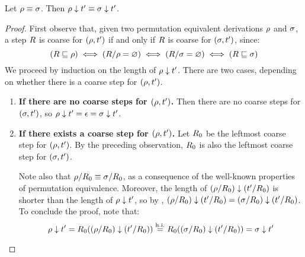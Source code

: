 \begin{lemma}
Let $\rho \equiv \sigma$. Then $\rho \downarrow t' \equiv \sigma \downarrow t'$.
\end{lemma}
\begin{proof}
First observe that, given two permutation equivalent derivations $\rho$ and $\sigma$,
a step $R$ is coarse for $(\rho,t')$ if and only if $R$ is coarse for $(\sigma,t')$,
since:
\[
  (R \sqsubseteq \rho) \iff (R/\rho = \varnothing) \iff (R/\sigma = \varnothing) \iff (R \sqsubseteq \sigma)
\]
We proceed by induction on the length of $\rho \downarrow t'$.
There are two cases, depending on whether there is a coarse step for $(\rho,t')$.
\begin{enumerate}
\item {\bf If there are no coarse steps for $(\rho,t')$.}
  Then there are no coarse steps for $(\sigma,t')$,
  so $\rho \downarrow t' = \epsilon = \sigma \downarrow t'$.
\item {\bf If there exists a coarse step for $(\rho,t')$.}
  Let $R_0$ be the leftmost coarse step for $(\rho,t')$.
  By the preceding observation, $R_0$ is also the leftmost coarse step for $(\sigma,t')$.

  Note also that $\rho/R_0 \equiv \sigma/R_0$,
  as a consequence of the well-known properties of permutation equivalence.
  Moreover, the length of $(\rho/R_0) \downarrow (t'/R_0)$ is
  shorter than the length of $\rho \downarrow t'$,
  so by \ih, $(\rho/R_0) \downarrow (t'/R_0) = (\sigma/R_0) \downarrow (t'/R_0)$.
  To conclude the proof, note that:
  \[
    \rho \downarrow t' = R_0 ((\rho/R_0) \downarrow (t'/R_0))
    \overset{\mathrm{h.i.}}{=} R_0 ((\sigma/R_0) \downarrow (t'/R_0)) = \sigma \downarrow t'
  \]
\end{enumerate}
\end{proof}

